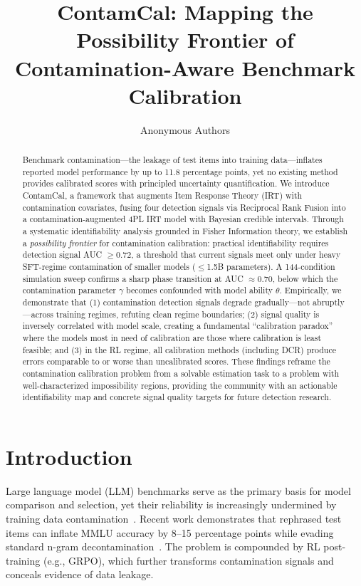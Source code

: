 \documentclass[letterpaper,11pt]{article}
\title{ContamCal: Mapping the Possibility Frontier of\\Contamination-Aware Benchmark Calibration}
\author{
Anonymous Authors
}
\begin{document}
\maketitle

\begin{abstract}
Benchmark contamination---the leakage of test items into training data---inflates reported model performance by up to 11.8 percentage points, yet no existing method provides calibrated scores with principled uncertainty quantification.
We introduce ContamCal, a framework that augments Item Response Theory (IRT) with contamination covariates, fusing four detection signals via Reciprocal Rank Fusion into a contamination-augmented 4PL IRT model with Bayesian credible intervals.
Through a systematic identifiability analysis grounded in Fisher Information theory, we establish a \emph{possibility frontier} for contamination calibration: practical identifiability requires detection signal AUC $\geq 0.72$, a threshold that current signals meet only under heavy SFT-regime contamination of smaller models ($\leq$1.5B parameters).
A 144-condition simulation sweep confirms a sharp phase transition at AUC $\approx 0.70$, below which the contamination parameter $\gamma$ becomes confounded with model ability $\theta$.
Empirically, we demonstrate that (1) contamination detection signals degrade gradually---not abruptly---across training regimes, refuting clean regime boundaries; (2) signal quality is inversely correlated with model scale, creating a fundamental ``calibration paradox'' where the models most in need of calibration are those where calibration is least feasible; and (3) in the RL regime, all calibration methods (including DCR) produce errors comparable to or worse than uncalibrated scores.
These findings reframe the contamination calibration problem from a solvable estimation task to a problem with well-characterized impossibility regions, providing the community with an actionable identifiability map and concrete signal quality targets for future detection research.
\end{abstract}

\section{Introduction}

Large language model (LLM) benchmarks serve as the primary basis for model comparison and selection, yet their reliability is increasingly undermined by training data contamination~\citep{sainz2023nlp,balloccu2024leak}.
Recent work demonstrates that rephrased test items can inflate MMLU accuracy by 8--15 percentage points while evading standard n-gram decontamination~\citep{yang2023rethinking,oren2024proving}.
The problem is compounded by RL post-training (e.g., GRPO), which further transforms contamination signals and conceals evidence of data leakage.
\end{document}
